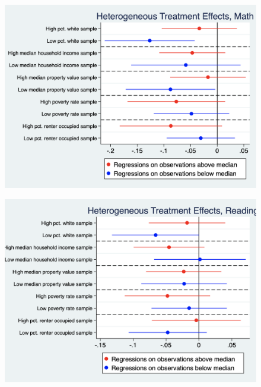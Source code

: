 \documentclass[12pt]{article}
\begin{document}
\begin{landscape}
\begin{figure}
    \centering
    \includegraphics[scale=0.5]{output/graphs/math_heterogeneous_effects.png}
    \caption{}
    \label{fig:my_label}
\end{figure}
\end{landscape}

\begin{landscape}

\begin{figure}
    \centering
    \includegraphics[scale=0.5]{output/graphs/read_heterogeneous_effects.png}
    \caption{}
    \label{fig:my_label}
\end{figure}
\end{landscape}
\end{document}
